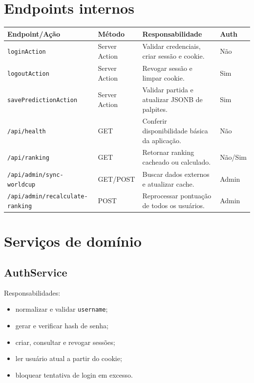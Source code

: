 \documentclass[12pt,a4paper]{article}
\begin{document}
\section{Endpoints internos}

\begin{longtable}{p{}p{}p{}p{}}
\toprule
\textbf{Endpoint/Ação} & \textbf{Método} & \textbf{Responsabilidade} & \textbf{Auth} \\
\midrule
\texttt{loginAction} & Server Action & Validar credenciais, criar sessão e cookie. & Não \\
\texttt{logoutAction} & Server Action & Revogar sessão e limpar cookie. & Sim \\
\texttt{savePredictionAction} & Server Action & Validar partida e atualizar JSONB de palpites. & Sim \\
\texttt{/api/health} & GET & Conferir disponibilidade básica da aplicação. & Não \\
\texttt{/api/ranking} & GET & Retornar ranking cacheado ou calculado. & Não/Sim \\
\texttt{/api/admin/\allowbreak sync-worldcup} & GET/POST & Buscar dados externos e atualizar cache. & Admin \\
\texttt{/api/admin/\allowbreak recalculate-ranking} & POST & Reprocessar pontuação de todos os usuários. & Admin \\
\bottomrule
\end{longtable}

\section{Serviços de domínio}

\subsection{AuthService}

Responsabilidades:
\begin{itemize}
  \item normalizar e validar \texttt{username};
  \item gerar e verificar hash de senha;
  \item criar, consultar e revogar sessões;
  \item ler usuário atual a partir do cookie;
  \item bloquear tentativa de login em excesso.
\end{itemize}
\end{document}
